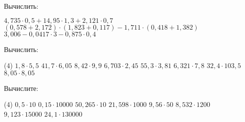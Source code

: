 \begin{class}[number=7]
	\begin{listofex}
		\item Вычислить:
		\begin{tasks}
			\task \( 4,735\cdot0,5+14,95\cdot1,3+2,121\cdot0,7 \)
			\task \( (0,578+2,172)\cdot(1,823+0,117)-1,711\cdot(0,418+1,382) \)
			\task \( 3,006-0,0417\cdot3-0,875\cdot0,4 \)
		\end{tasks}
		\item Вычислить:
		\begin{tasks}(4)
			\task \( 1,8\cdot5,5 \)
			\task \( 41,7\cdot6,05 \)
			\task \( 8,42\cdot9,9 \)
			\task \( 6,703\cdot2,45 \)
			\task \( 55,3\cdot3,81 \)
			\task \( 6,321\cdot7,8 \)
			\task \( 32,4\cdot103,5 \)
			\task \( 8,05\cdot8,05 \)
		\end{tasks}
		\item Вычислите:
		\begin{tasks}(4)
			\task \( 0,5\cdot10 \)
			\task \( 0,15\cdot10000 \)
			\task \( 50,265\cdot10 \)
			\task \( 21,598\cdot1000 \)
			\task \( 9,56\cdot50 \)
			\task \( 8,532\cdot1200 \)
			\task \( 9,123\cdot15000 \)
			\task \( 24,1\cdot130000 \)
		\end{tasks}

	\end{listofex}
\end{class}

